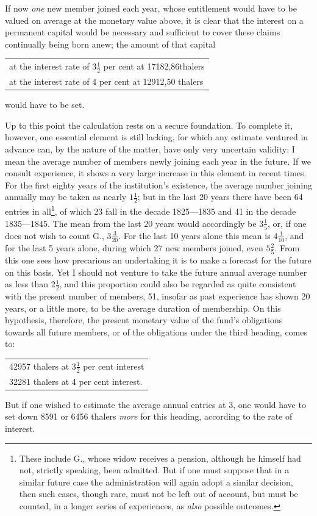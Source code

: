 If now \textit{one} new member joined each year, whose entitlement would have to be valued on average at the monetary value above, it is clear that the interest on a permanent capital would be necessary and sufficient to cover these claims continually being born anew; the amount of that capital
\begin{center}
\begin{tabular}{l}
at the interest rate of \(3\tfrac{1}{2}\) per cent at 17182,86thalers\\
at the interest rate of 4 per cent at 12912,50 thalers
\end{tabular}
\end{center}
\noindent would have to be set.

Up to this point the calculation rests on a secure foundation. To complete it, however, one essential element is still lacking, for which any estimate ventured in advance can, by the nature of the matter, have only very uncertain validity: I mean the average number of members newly joining each year in the future. If we consult experience, it shows a very large increase in this element in recent times. For the first eighty years of the institution's existence, the average number joining annually may be taken as nearly \(1\tfrac{1}{2}\); but in the last 20 years there have been 64 entries in all\footnote{These include G., whose widow receives a pension, although he himself had not, strictly speaking, been admitted. But if one must suppose that in a similar future case the administration will again adopt a similar decision, then such cases, though rare, must not be left out of account, but must be counted, in a longer series of experiences, as \textit{also} possible outcomes.}, of which 23 fall in the decade 1825—1835 and 41 in the decade 1835—1845. The mean from the last 20 years would accordingly be \(3\tfrac{1}{5}\), or, if one does not wish to count G., \(3\tfrac{3}{20}\). For the last 10 years alone this mean is \(4\tfrac{1}{10}\), and for the last 5 years alone, during which 27 new members joined, even \(5\tfrac{2}{5}\). From this one sees how precarious an undertaking it is to make a forecast for the future on this basis. Yet I should not venture to take the future annual average number as less than \(2\tfrac{1}{2}\), and this proportion could also be regarded as quite consistent with the present number of members, 51, insofar as past experience has shown 20 years, or a little more, to be the average duration of membership. On this hypothesis, therefore, the present monetary value
of the fund's obligations towards all future members, or of the obligations under the third heading, comes to:
\begin{center}
\begin{tabular}{l}
42957 thalers at \(3\tfrac{1}{2}\) per cent interest\\
32281 thalers at 4 per cent interest.
\end{tabular}
\end{center}
\noindent\hspace*{\parindent}But if one wished to estimate the average annual entries at 3, one would have to set down 8591 or 6456 thalers \textit{more} for this heading, according to the rate of interest.

